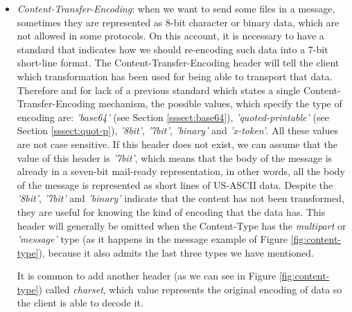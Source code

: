 \begin{itemize}
	\item\textit{Content-Transfer-Encoding}: when we want to send some files in a message, sometimes they are represented as 8-bit character or binary data, which are not allowed in some protocols. On this account, it is necessary to have a standard that indicates how we should re-encoding such data into a 7-bit short-line format. The Content-Transfer-Encoding header \citep[Section 5]{rfc1341} will tell the client which transformation has been used for being able to transport that data. Therefore and for lack of a previous standard which states a single Content-Transfer-Encoding mechanism, the possible values, which specify the type of encoding are: \textit{'base64'} (see Section \ref{sssect:base64}), \textit{'quoted-printable'} (see Section \ref{sssect:quot-p}), \textit{'8bit'}, \textit{'7bit'}, \textit{'binary'} and \textit{'x-token'}. All these values are not case sensitive. If this header does not exist, we can assume that the value of this header is \textit{'7bit'}, which means that the body of the message is already in a seven-bit mail-ready representation, in other words, all the body of the message is represented as short lines of US-ASCII data. Despite the \textit{'8bit'}, \textit{'7bit'} and \textit{'binary'} indicate that the content has not been transformed, they are useful for knowing the kind of encoding that the data has. This header will generally be omitted when the Content-Type has the \textit{multipart} or \textit{'message'} type (as it happens in the message example of Figure \ref{fig:content-type}), because it also admits the last three types we have mentioned.
	
	It is common to add another header (as we can see in Figure \ref{fig:content-type}) called \textit{charset}, which value represents the original encoding of data so the client is able to decode it.
\end{itemize}


